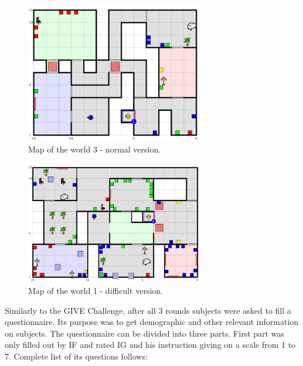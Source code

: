 \begin{figure}[!htbp]
  \centering
	\includegraphics[width=0.7\textwidth]{Images/dataset-world3}
	\caption{Map of the world 3 - normal version.}
	\label{fig:dataset-world3}
\end{figure}

\begin{figure}[!htbp]
  \centering
	\includegraphics[width=0.7\textwidth]{Images/dataset-world1d}
	\caption{Map of the world 1 - difficult version.}
	\label{fig:dataset-world1d}
\end{figure}

Similarly to the GIVE Challenge, after all 3 rounds subjects were asked to fill a questionnaire. Its purpose was to get demographic and other relevant information on subjects. The questionnaire can be divided into three parts. First part was only filled out by IF and rated IG and his instruction giving on a scale from 1 to 7. Complete list of its questions follows: 

